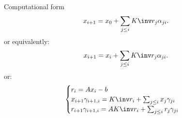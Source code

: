\begin{simplified}
  \begin{frame}{Computational form}
    \[
    x_{i+1} = x_0 +\sum_{j\leq i} K\inv r_j\alpha_{ji}.
    \]
    or equivalently:
    \[
    x_{i+1} = x_i +\sum_{j\leq i} K\inv r_j\alpha_{ji}.
    \]
    or:    
    \[
    \begin{cases}
      r_i = Ax_i-b\\
      x_{i+1}\gamma_{i+1,i}=K\inv r_i+\sum_{j\leq i} x_j\gamma_{ji}\\
      r_{i+1}\gamma_{i+1,i}=AK\inv r_i+\sum_{j\leq i} r_j\gamma_{ji}
    \end{cases}
    \]
  \end{frame}
\end{simplified}

